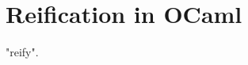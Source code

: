 \begin{coqdoccode}
\end{coqdoccode}
\section{Reification in OCaml}

\begin{coqdoccode}
\coqdocemptyline
\coqdocnoindent
{}   "reify".\coqdoceol
\end{coqdoccode}
